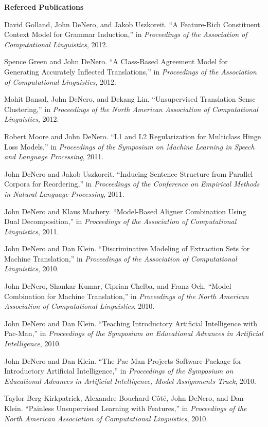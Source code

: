 \documentclass[margin,line]{res}
\begin{document}
\begin{resume}
{\bf Refereed Publications }

David Golland, John DeNero, and Jakob Uszkoreit. ``A Feature-Rich Constituent Context Model for Grammar Induction,'' in {\it Proceedings of the Association of Computational Linguistics}, 2012.

Spence Green and John DeNero. ``A Class-Based Agreement Model for Generating Accurately Inflected Translations,'' in {\it Proceedings of the Association of Computational Linguistics}, 2012.

Mohit Bansal, John DeNero, and Dekang Lin. ``Unsupervised Translation Sense Clustering,'' in {\it Proceedings of the North American Association of Computational Linguistics}, 2012.

Robert Moore and John DeNero. ``L1 and L2 Regularization for Multiclass Hinge Loss Models,'' in {\it Proceedings of the Symposium on Machine Learning in Speech and Language Processing}, 2011.

John DeNero and Jakob Uszkoreit.  ``Inducing Sentence Structure from Parallel Corpora for Reordering,'' in {\it  Proceedings of the Conference on Empirical Methods in Natural Language Processing}, 2011.

John DeNero and Klaus Machery. ``Model-Based Aligner Combination Using Dual Decomposition,'' in {\it Proceedings of the Association of Computational Linguistics}, 2011.

John DeNero and Dan Klein. ``Discriminative Modeling of Extraction Sets for Machine Translation,'' in {\it Proceedings of the Association of Computational Linguistics}, 2010.

John DeNero, Shankar Kumar, Ciprian Chelba, and Franz Och. ``Model Combination for Machine Translation,'' in {\it Proceedings of the North American Association of Computational Linguistics}, 2010.

John DeNero and Dan Klein. ``Teaching Introductory Artificial Intelligence with Pac-Man,'' in {\it Proceedings of the Symposium on Educational Advances in Artificial Intelligence}, 2010.

John DeNero and Dan Klein. ``The Pac-Man Projects Software Package for Introductory Artificial Intelligence,'' in {\it Proceedings of the Symposium on Educational Advances in Artificial Intelligence, Model Assignments Track}, 2010.

Taylor Berg-Kirkpatrick, Alexandre Bouchard-Côté, John DeNero, and Dan Klein. ``Painless Unsupervised Learning with Features,'' in {\it Proceedings of the North American Association of Computational Linguistics}, 2010.


\end{resume}
\end{document}

